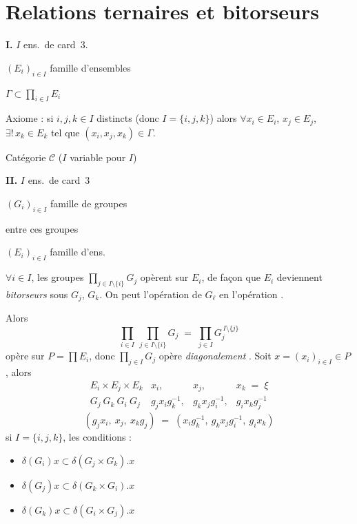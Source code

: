 \documentclass[11pt,a4paper]{article}
\begin{document}
\section{Relations ternaires et bitorseurs}

\textbf{I.} $I$ ens.\ de card~$3$.

$(E_i)_{i\in I}$ famille d'ensembles

$\Gamma\subset\prod_{i\in I}E_i$

Axiome : si \struck{\ill{}} $i,j,k\in I$ distincts (donc $I=\{i,j,k\}$) alors $\forall x_i\in E_i$, $x_j\in E_j$, $\exists!\,x_k\in E_k$ tel que $(x_i,x_j,x_k)\in\Gamma$.

Catégorie $\mathcal{C}$ ($I$ variable \uncertain{;} pour  $I$)

\textbf{II.} $I$ ens.\ de card~$3$

$(G_i)_{i\in I}$ famille de groupes

 entre ces groupes

$(E_i)_{i\in I}$ famille d'ens.

$\forall i\in I$, les groupes $\prod_{j\in I\setminus\{i\}}G_j$ opèrent sur $E_i$, de façon  que $E_i$ deviennent  \emph{bitorseurs} sous $G_j$, $G_k$. On peut  l'opération de $G_\ell$ en l'opération .

Alors
\[
  \prod_{i\in I}\ \prod_{j\in I\setminus\{i\}}G_j \;=\; \prod_{j\in I}G_j^{\,I\setminus\{j\}}
\]
opère sur $P=\prod E_i$, donc $\prod_{j\in I}G_j$ opère \emph{diagonalement} . Soit $x=(x_i)_{i\in I}\in P$, alors
\[
  \begin{array}{cccc}
    E_i\times E_j\times E_k & x_i, & x_j, & x_k \;=\;\xi\\
    G_j\ G_k\ G_i\ G_j & g_jx_ig_k^{-1}, & g_kx_jg_i^{-1}, & g_ix_kg_j^{-1}
  \end{array}
\]
\[
  (g_jx_i,\ x_j,\ x_kg_j) \;=\; (x_ig_k^{-1},\ g_kx_jg_i^{-1},\ g_ix_k)
\]
si $I=\{i,j,k\}$, les conditions \struck{\ill{}}  :
\begin{itemize}
  \item[a$_1$)] $\delta(G_i)x\subset\delta(G_j\times G_k).x$
  \item[a$_2$)] $\delta(G_j)x\subset\delta(G_k\times G_i).x$
  \item[a$_3$)] $\delta(G_k)x\subset\delta(G_i\times G_j).x$
\end{itemize}
\end{document}
